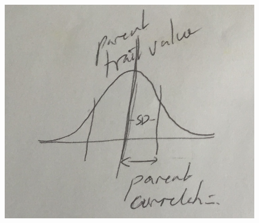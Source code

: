 \begin{figure}[ht]
	\centering
	\includegraphics[width=0.95\linewidth]{figures/correlation}
\end{figure}

